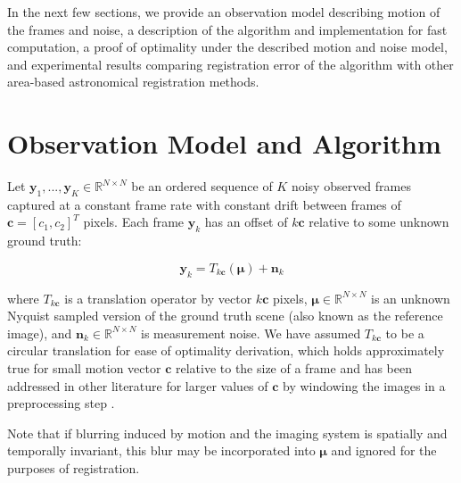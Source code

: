 \documentclass{article}
\begin{document}

In the next few sections, we provide an observation model describing motion of the frames and noise, a description of the algorithm and implementation for fast computation, a proof of optimality under the described motion and noise model, and experimental results comparing registration error of the algorithm with other area-based astronomical registration methods.

\section{Observation Model and Algorithm}
\label{sec:algorithm}

Let $\bm{y}_1, ..., \bm{y}_K \in \mathbb{R}^{N \times N}$ be an ordered sequence of $K$ noisy observed frames captured at a constant frame rate with constant drift between frames of $\bm{c}=[c_1, c_2]^T$ pixels.  Each frame $\bm{y}_k$ has an offset of $k\bm{c}$ relative to some unknown ground truth:

\begin{equation}
\bm{y}_k = T_{k\bm{c}}(\bm{\mu}) + \bm{n}_k
\label{eq:model}
\end{equation}


where $T_{k\bm{c}}$ is a translation operator by vector $k\bm{c}$ pixels, $\bm{\mu} \in \mathbb{R}^{N \times N}$ is an unknown Nyquist sampled version of the ground truth scene (also known as the reference image), and $\bm{n}_k \in \mathbb{R}^{N \times N}$ is measurement noise.  We have assumed $T_{k\bm{c}}$ to be a circular translation for ease of optimality derivation, which holds approximately true for small motion vector $\bm{c}$ relative to the size of a frame and has been addressed in other literature for larger values of $\bm{c}$ by windowing the images in a preprocessing step \cite{cain2001projection}.

Note that if blurring induced by motion and the imaging system is spatially and temporally invariant, this blur may be incorporated into $\bm{\mu}$ and ignored for the purposes of registration.
\end{document}
